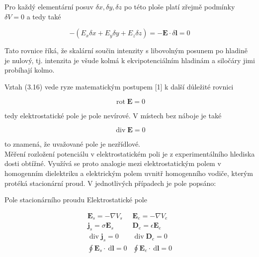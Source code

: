 \documentclass[10pt]{article}
\begin{document}
Pro každý elementární posuv $\delta x, \delta y, \delta z$ po této ploše platí zřejmě podmínky $\delta V=0$ a tedy také


\begin{equation*}
-\left(E_{x} \delta x+E_{y} \delta y+E_{z} \delta z\right)=-\boldsymbol{E} \cdot \delta \boldsymbol{l}=0 \tag{3.18}
\end{equation*}


Tato rovnice říká, že skalární součin intenzity s libovolným posunem po hladině je nulový, tj. intenzita je všude kolmá k ekvipotenciálním hladinám a siločáry jimi probíhají kolmo.

Vztah (3.16) vede ryze matematickým postupem [1] k další důležité rovnici


\begin{equation*}
\operatorname{rot} \boldsymbol{E}=0 \tag{3.19}
\end{equation*}


tedy elektrostatické pole je pole nevírové. V místech bez náboje je také


\begin{equation*}
\operatorname{div} \boldsymbol{E}=0 \tag{3.20}
\end{equation*}


to znamená, že uvažované pole je nezřídlové.\\
Měření rozložení potenciálu v elektrostatickém poli je z experimentálního hlediska dosti obtížné. Využívá se proto analogie mezi elektrostatickým polem v homogenním dielektriku a elektrickým polem uvnitř homogenního vodiče, kterým protéká stacionární proud. V jednotlivých případech je pole popsáno:

Pole stacionárního proudu Elektrostatické pole

\[
\begin{array}{rc}
\boldsymbol{E}_{s}=-\nabla V_{s} & \boldsymbol{E}_{e}=-\nabla V_{e}  \tag{3.21}\\
\boldsymbol{j}_{s}=\sigma \boldsymbol{E}_{s} & \boldsymbol{D}_{e}=\epsilon \boldsymbol{E}_{e} \\
\operatorname{div} \boldsymbol{j}_{s}=0 & \operatorname{div} \boldsymbol{D}_{e}=0 \\
\oint \boldsymbol{E}_{s} \cdot \mathrm{~d} \boldsymbol{l}=0 & \oint \boldsymbol{E}_{e} \cdot \mathrm{~d} \boldsymbol{l}=0
\end{array}
\]
\end{document}
